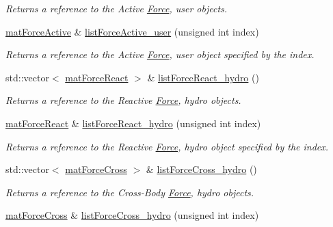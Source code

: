 \begin{DoxyCompactItemize}
\begin{DoxyCompactList}\small\item\em Returns a reference to the Active \hyperlink{classosea_1_1ofreq_1_1_force}{Force}, user objects. \end{DoxyCompactList}\item 
\hyperlink{classosea_1_1ofreq_1_1mat_force_active}{mat\-Force\-Active} \& \hyperlink{classosea_1_1ofreq_1_1mat_body_a7d79de764dd75ad606a1cc9346b58676}{list\-Force\-Active\-\_\-user} (unsigned int index)
\begin{DoxyCompactList}\small\item\em Returns a reference to the Active \hyperlink{classosea_1_1ofreq_1_1_force}{Force}, user object specified by the index. \end{DoxyCompactList}\item 
std\-::vector$<$ \hyperlink{classosea_1_1ofreq_1_1mat_force_react}{mat\-Force\-React} $>$ \& \hyperlink{classosea_1_1ofreq_1_1mat_body_abead59c1604f4581a977e086874b2e7a}{list\-Force\-React\-\_\-hydro} ()
\begin{DoxyCompactList}\small\item\em Returns a reference to the Reactive \hyperlink{classosea_1_1ofreq_1_1_force}{Force}, hydro objects. \end{DoxyCompactList}\item 
\hyperlink{classosea_1_1ofreq_1_1mat_force_react}{mat\-Force\-React} \& \hyperlink{classosea_1_1ofreq_1_1mat_body_a052f37c59ad093d92e1155e0b300d1aa}{list\-Force\-React\-\_\-hydro} (unsigned int index)
\begin{DoxyCompactList}\small\item\em Returns a reference to the Reactive \hyperlink{classosea_1_1ofreq_1_1_force}{Force}, hydro object specified by the index. \end{DoxyCompactList}\item 
std\-::vector$<$ \hyperlink{classosea_1_1ofreq_1_1mat_force_cross}{mat\-Force\-Cross} $>$ \& \hyperlink{classosea_1_1ofreq_1_1mat_body_a40e3fc33bc7b1685b7f1400312f88f88}{list\-Force\-Cross\-\_\-hydro} ()
\begin{DoxyCompactList}\small\item\em Returns a reference to the Cross-\/\-Body \hyperlink{classosea_1_1ofreq_1_1_force}{Force}, hydro objects. \end{DoxyCompactList}\item 
\hyperlink{classosea_1_1ofreq_1_1mat_force_cross}{mat\-Force\-Cross} \& \hyperlink{classosea_1_1ofreq_1_1mat_body_ad8ce408c1042c080cda0d50a3864fa54}{list\-Force\-Cross\-\_\-hydro} (unsigned int index)

\end{DoxyCompactItemize}
